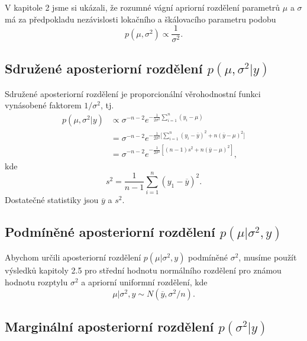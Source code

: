 V kapitole 2 jsme si ukázali, že rozumné vágní apriorní rozdělení parametrů $\mu$ a $\sigma$ má za předpokladu nezávislosti lokačního a škálovacího parametru podobu
\begin{equation}
p(\mu, \sigma^2) \varpropto \frac{1}{\sigma^2}.
\end{equation}

\subsection{Sdružené aposteriorní rozdělení $p(\mu, \sigma^2 | y)$}

Sdružené aposteriorní rozdělení je proporcionální věrohodnostní funkci vynásobené faktorem $1 / \sigma^2$, tj.
\begin{equation}
\begin{split}
p(\mu, \sigma^2 | y) & \varpropto \sigma^{-n - 2} e^{-\frac{1}{2 \sigma^2} \sum_{i = 1}^n (y_i - \mu)}\\
 & = \sigma^{-n - 2} e^{-\frac{1}{2 \sigma ^ 2} \Big[\sum_{i = 1}^n (y_i - \overline{y}) ^ 2 + n(\overline{y} - \mu) ^ 2\Big]}\\
 & = \sigma^{-n - 2} e^{-\frac{1}{2 \sigma ^ 2} [(n - 1)s ^ 2 + n(\overline{y} - \mu) ^ 2]},
\end{split}
\end{equation}
kde
\begin{equation}
s ^ 2 = \frac{1}{n - 1} \sum_{i = 1} ^ n (y_1 - \overline{y}) ^ 2.
\end{equation}
Dostatečné statistiky jsou $\overline{y}$ a $s^2$.

\subsection{Podmíněné aposteriorní rozdělení $p(\mu | \sigma^2, y)$}

Abychom určili aposteriorní rozdělení $p(\mu | \sigma^2, y)$ podmíněné $\sigma^2$, musíme použít výsledků kapitoly 2.5 pro střední hodnotu normálního rozdělení pro známou hodnotu rozptylu $\sigma^2$ a apriorní uniformní rozdělení, kde
\begin{equation}
\mu | \sigma^2, y \sim N(\overline{y}, \sigma^2 / n).
\end{equation}

\subsection{Marginální aposteriorní rozdělení $p(\sigma^2 | y)$}

